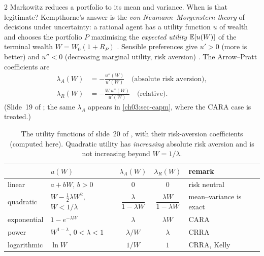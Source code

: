 \begin{paracol}{2}
Markowitz reduces a portfolio to its mean and variance. When is that legitimate? Kempthorne's answer is the
\emph{von Neumann--Morgenstern theory} of decisions under uncertainty: a rational agent has a utility function
$u$ of wealth and chooses the portfolio $P$ maximising the \emph{expected utility} $\mathbb{E}[u(W)]$ of the terminal
wealth $W=W_0(1+R_P)$ . Sensible preferences give
$u'>0$ (more is better) and $u''<0$ (decreasing marginal utility, risk aversion) . The
Arrow--Pratt coefficients are
\begin{align*}
  \lambda_A(W)&=-\frac{u''(W)}{u'(W)}\quad\text{(absolute risk aversion)},\\
  \lambda_R(W)&=-\frac{W\,u''(W)}{u'(W)}\quad\text{(relative)}.
\end{align*}
(Slide~19 of ; the same $\lambda_A$ appears in \cref{ch03:sec-capm}, where the CARA case is treated.)

\begin{table}[ht]
\centering
\begin{tabular}{@{}llccl@{}}
\toprule
& $u(W)$ & $\lambda_A(W)$ & $\lambda_R(W)$ & remark\\
\midrule
linear & $a+bW$, $b>0$ & $0$ & $0$ & risk neutral\\
quadratic & $W-\frac12\lambda W^2$, $W<1/\lambda$ & $\dfrac\lambda{1-\lambda W}$ & $\dfrac{\lambda W}{1-\lambda W}$ & mean--variance is exact\\
exponential & $1-e^{-\lambda W}$ & $\lambda$ & $\lambda W$ & CARA\\
power & $W^{1-\lambda}$, $0<\lambda<1$ & $\lambda/W$ & $\lambda$ & CRRA\\
logarithmic & $\ln W$ & $1/W$ & $1$ & CRRA, Kelly\\
\bottomrule
\end{tabular}
\caption{The utility functions of slide~20 of  , with their risk-aversion coefficients (computed here).
Quadratic utility has \emph{increasing} absolute risk aversion and is not increasing beyond $W=1/\lambda$.}\label{ch10:tab-utility}
\end{table}


\end{paracol}
